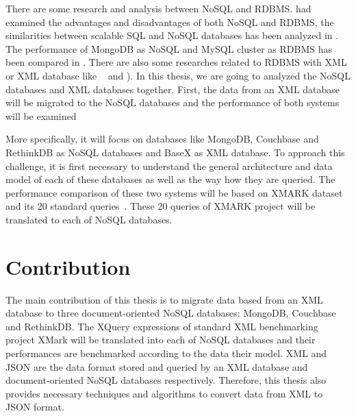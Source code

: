 	\par		
	There are some research and analysis between NoSQL and RDBMS. \citet{nance2013nosql} had examined the advantages and disadvantages of both NoSQL and RDBMS, the similarities between scalable SQL and NoSQL databases has been analyzed in \cite{cattell2011scalable}. The performance of MongoDB as NoSQL and MySQL cluster as  RDBMS has been compared in   \cite{hadjigeorgiou2013rdbms}.  There are also some researches related to RDBMS with XML or XML database like ~\cite{jiang2002xparent} and \cite{shanmugasundaram1999relational}).
	In this thesis, we are going to analyzed the NoSQL databases and XML databases together. First, the data from an XML database will be migrated to the NoSQL databases and the performance of both systems will be examined
\par 
More specifically, it will focus on databases like MongoDB, Couchbase and RethinkDB as NoSQL databases and BaseX as XML database. To approach this challenge, it is first necessary to understand the general architecture and data model of each of these databases as well as the way how they are queried. The performance comparison of these two systems will be based on XMARK dataset and its 20 standard queries~\citep{xmark/original}. These 20 queries of XMARK project will be translated to each of NoSQL databases.
	
	\section{Contribution}
		The main contribution of this thesis is to migrate data based from an XML database to three document-oriented NoSQL databases: MongoDB, Couchbase and RethinkDB. The XQuery expressions of standard XML benchmarking project XMark will be  translated  into each of NoSQL databases and their performances are  benchmarked according to the data their model. XML and JSON are the data format stored and queried by an XML database and document-oriented NoSQL databases respectively. Therefore, this thesis also provides necessary techniques and algorithms to convert data from XML to JSON format.
	    
		
